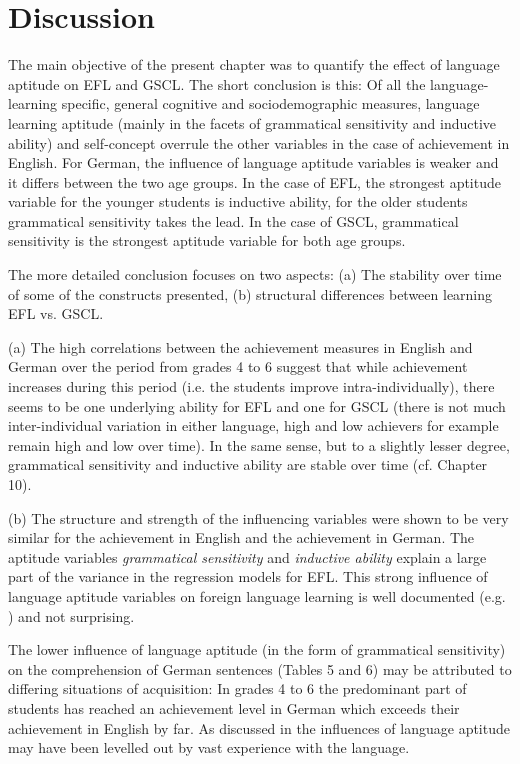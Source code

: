 \documentclass[output=paper]{langsci/langscibook}
\begin{document}
\section{Discussion}\label{sec:09:5}

The main objective of the present chapter was to quantify the effect of language aptitude on EFL and GSCL. The short conclusion is this: Of all the language-learning specific, general cognitive and sociodemographic measures, language learning aptitude (mainly in the facets of grammatical sensitivity and inductive ability) and self-concept overrule the other variables in the case of achievement in English. For German, the influence of language aptitude variables is weaker and it differs between the two age groups. In the case of EFL, the strongest aptitude variable for the younger students is inductive ability, for the older students grammatical sensitivity takes the lead. In the case of GSCL, grammatical sensitivity is the strongest aptitude variable for both age groups.

The more detailed conclusion focuses on two aspects: (a) The stability over time of some of the constructs presented, (b) structural differences between learning EFL vs. GSCL. 

(a) The high correlations between the achievement measures in English and German over the period from grades 4 to 6 suggest that while achievement increases during this period (i.e. the students improve intra-individually), there seems to be one underlying ability for EFL and one for GSCL (there is not much inter-individual variation in either language, high and low achievers for example remain high and low over time). In the same sense, but to a slightly lesser degree, grammatical sensitivity and inductive ability are stable over time (cf. Chapter 10).

(b) The structure and strength of the influencing variables were shown to be very similar for the achievement in English and the achievement in German. The aptitude variables \textit{grammatical sensitivity} and \textit{inductive ability} explain a large part of the variance in the regression models for EFL. This strong influence of language aptitude variables on foreign language learning is well documented (e.g. \citealt{Li2016}) and not surprising. 

The lower influence of language aptitude (in the form of grammatical sensitivity) on the comprehension of German sentences (Tables 5 and 6) may be attributed to differing situations of acquisition: In grades 4 to 6 the predominant part of students has reached an achievement level in German which exceeds their achievement in English by far. As discussed in  the influences of language aptitude may have been levelled out by vast experience with the language.
\end{document}
